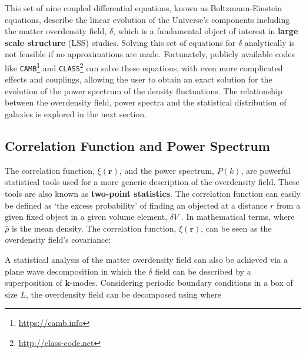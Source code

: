 \qquad This set of nine coupled differential equations, known as Boltzmann-Einstein equations, describe the linear evolution of the Universe's components including the matter overdensity field, $\delta$, which is a fundamental object of interest in \textbf{large scale structure} (LSS) studies. Solving this set of equations for $\delta$ analytically is not feasible if no approximations are made. Fortunately, publicly available codes like \texttt{CAMB}\footnote{\url{https://camb.info}} \citep{CAMB} and \texttt{CLASS}\footnote{\url{http://class-code.net}} \citep{Class} can solve these equations, with even more complicated effects and couplings, allowing the user to obtain an exact solution for the evolution of the power spectrum of the density fluctuations. The relationship between the overdensity field, power spectra and the statistical distribution of galaxies is explored in the next section.

\subsection{Correlation Function and Power Spectrum}\label{Sec:Intro:Pk}
The correlation function, $\xi (\textbf{r})$, and the power spectrum, $P(k)$, are powerful statistical tools used for a more generic description of the overdensity field. These tools are also known as \textbf{two-point statistics}. The correlation function can easily be defined as `the excess probability' of finding an objected at a distance $r$ from a given fixed object in a given volume element, $\delta V$ \citep{Peebles1973}. In mathematical terms,
where $\bar{\rho}$ is the mean density. The correlation function, $\xi(\textbf{r})$, can be seen as the overdensity field's covariance:


\qquad A statistical analysis of the matter overdensity field can also be achieved via a plane wave decomposition in which the $\delta$ field can be described by a superposition of $\textbf{k}$-modes. Considering periodic boundary conditions in a box of size $L$, the overdensity field can be decomposed using
where

